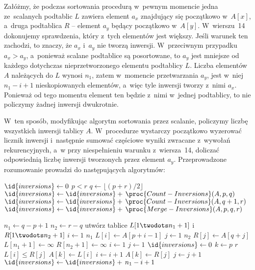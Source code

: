 \subproblem %
Załóżmy, że podczas sortowania procedurą  w~pewnym momencie jedna ze~scalanych podtablic $L$ zawiera element $a_x$ znajdujący się początkowo w~$A[x]$, a~druga podtablica $R$ -- element $a_y$ będący początkowo w~$A[y]$. W~wierszu~14 dokonujemy sprawdzenia, który z~tych elementów jest większy. Jeśli warunek ten zachodzi, to znaczy, że $a_x$ i~$a_y$ nie tworzą inwersji. W~przeciwnym przypadku $a_x>a_y$, a~ponieważ scalane podtablice są posortowane, to $a_y$ jest mniejsze od każdego dotychczas nieprzetworzonego elementu podtablicy $L$. Liczba elementów $A$ należących do $L$ wynosi $n_1$, zatem w~momencie przetwarzania $a_y$, jest w~niej $n_1-i+1$ nieskopiowanych elementów, a~więc tyle inwersji tworzy z~nimi $a_x$. Ponieważ od tego momentu element ten będzie z~nimi w~jednej podtablicy, to nie policzymy żadnej inwersji dwukrotnie.

W~ten sposób, modyfikując algorytm sortowania przez scalanie, policzymy liczbę wszystkich inwersji tablicy $A$. W~procedurze  wystarczy początkowo wyzerować licznik inwersji i~następnie sumować częściowe wyniki zwracane z~wywołań rekurencyjnych, a~w  przy niespełnieniu warunku z~wiersza~14, doliczać odpowiednią liczbę inwersji tworzonych przez element $a_y$. Przeprowadzone rozumowanie prowadzi do następujących algorytmów:

\begin{codebox}
\li	$\id{inversions}\gets0$
\li	\If $p<r$
\li		\Then
			$q\gets\lfloor(p+r)/2\rfloor$
\li			$\id{inversions}\gets\id{inversions}+\,\proc{Count-Inversions}(A,p,q)$
\li			$\id{inversions}\gets\id{inversions}+\,\proc{Count-Inversions}(A,q+1,r)$
\li			$\id{inversions}\gets\id{inversions}+\,\proc{Merge-Inversions}(A,p,q,r)$
		\End
\li	\Return{}
\end{codebox}

\begin{codebox}
\li	$n_1\gets q-p+1$
\li	$n_2\gets r-q$
\li	utwórz tablice $L[1\twodots n_1+1]$ i~$R[1\twodots n_2+1]$
\li	\For $i\gets1$ \To $n_1$
\li		\Do
			$L[i]\gets A[p+i-1]$
		\End
\li	\For $j\gets1$ \To $n_2$
\li		\Do
			$R[j]\gets A[q+j]$
		\End
\li	$L[n_1+1]\gets\infty$
\li	$R[n_2+1]\gets\infty$
\li	$i\gets1$
\li	$j\gets1$
\li	$\id{inversions}\gets0$
\li	\For $k\gets p$ \To $r$
\li		\Do
\li			\If $L[i]\le R[j]$
\li				\Then
					$A[k]\gets L[i]$
\li					$i\gets i+1$
\li				\Else
					$A[k]\gets R[j]$
\li					$j\gets j+1$
\li					$\id{inversions}\gets\id{inversions}+\,n_1-i+1$
				\End
		\End
\li	\Return{}
\end{codebox}

\endinput
